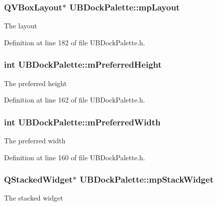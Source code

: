 \hypertarget{class_u_b_dock_palette_a6678ff62b4546a46acb55763dd46b849}{
\subsubsection[{mp\-Layout}]{\setlength{\rightskip}{0pt plus 5cm}Q\-V\-Box\-Layout$\ast$ U\-B\-Dock\-Palette\-::mp\-Layout\hspace{0.3cm}{\ttfamily [protected]}}}\label{dc/d54/class_u_b_dock_palette_a6678ff62b4546a46acb55763dd46b849}
The layout 

Definition at line 182 of file U\-B\-Dock\-Palette.\-h.

\hypertarget{class_u_b_dock_palette_a25e6b09786386b27e982a224431dfb8d}{
\subsubsection[{m\-Preferred\-Height}]{\setlength{\rightskip}{0pt plus 5cm}int U\-B\-Dock\-Palette\-::m\-Preferred\-Height\hspace{0.3cm}{\ttfamily [protected]}}}\label{dc/d54/class_u_b_dock_palette_a25e6b09786386b27e982a224431dfb8d}
The preferred height 

Definition at line 162 of file U\-B\-Dock\-Palette.\-h.

\hypertarget{class_u_b_dock_palette_a0f5fb645e2a3c25f671801ab2200fb1f}{
\subsubsection[{m\-Preferred\-Width}]{\setlength{\rightskip}{0pt plus 5cm}int U\-B\-Dock\-Palette\-::m\-Preferred\-Width\hspace{0.3cm}{\ttfamily [protected]}}}\label{dc/d54/class_u_b_dock_palette_a0f5fb645e2a3c25f671801ab2200fb1f}
The preferred width 

Definition at line 160 of file U\-B\-Dock\-Palette.\-h.

\hypertarget{class_u_b_dock_palette_a6af957d91461245a458cc5207e4398b1}{
\subsubsection[{mp\-Stack\-Widget}]{\setlength{\rightskip}{0pt plus 5cm}Q\-Stacked\-Widget$\ast$ U\-B\-Dock\-Palette\-::mp\-Stack\-Widget\hspace{0.3cm}{\ttfamily [protected]}}}\label{dc/d54/class_u_b_dock_palette_a6af957d91461245a458cc5207e4398b1}
The stacked widget 

